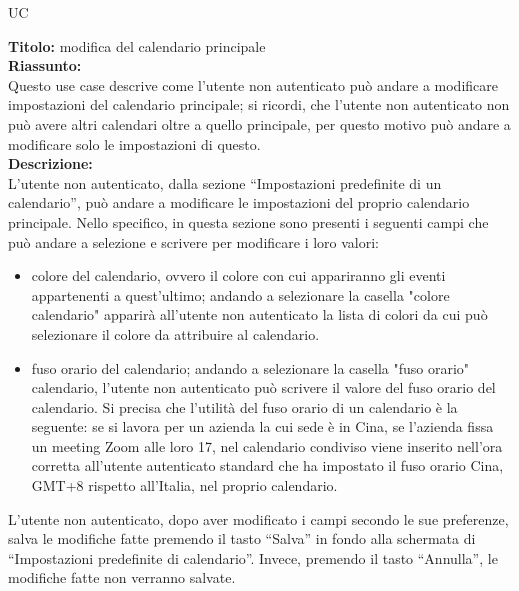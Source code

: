 \begin{listaPersonale}{UC}
    \begin{listaPersonale2}[UC] {}
        \newpage
            \textbf{Titolo: } modifica del calendario principale \\
            \textbf{Riassunto:} \\
            Questo use case descrive come l'utente non autenticato può andare a modificare impostazioni del calendario principale; si ricordi, che l'utente non autenticato non può avere altri calendari oltre a quello principale, per questo motivo può andare a modificare solo le impostazioni di questo. \\
            \textbf{Descrizione:} \\
            L'utente non autenticato, dalla sezione  “Impostazioni predefinite di un calendario”, può andare a modificare le impostazioni del proprio calendario principale. Nello specifico, in questa sezione sono presenti i seguenti campi che può andare a selezione e scrivere per modificare i loro valori:
            \begin{itemize}
                \item colore del calendario, ovvero il colore con cui appariranno gli eventi appartenenti a quest'ultimo; andando a selezionare la casella "colore calendario" apparirà all'utente non autenticato la lista di colori da cui può selezionare il colore da attribuire al calendario.
                \item fuso orario del calendario; andando a selezionare la casella "fuso orario" calendario, l'utente non autenticato può scrivere il valore del fuso orario del calendario. Si precisa che l'utilità del fuso orario di un calendario è la seguente:  se si lavora per un azienda la cui sede è in Cina, se l'azienda fissa un meeting Zoom alle loro 17, nel calendario condiviso viene inserito nell'ora corretta all'utente autenticato standard che ha impostato il fuso orario Cina, GMT+8 rispetto all'Italia, nel proprio calendario.
            \end{itemize}
            L'utente non autenticato, dopo aver modificato i campi secondo le sue preferenze, salva le modifiche fatte premendo il tasto “Salva” in fondo alla schermata di “Impostazioni predefinite di calendario”. Invece, premendo il tasto “Annulla”, le modifiche fatte non verranno salvate.


\end{listaPersonale2}
\end{listaPersonale}
